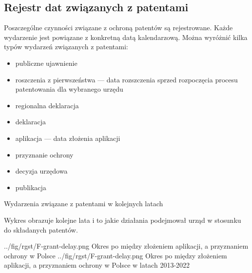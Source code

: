   \newpage\subsection
{Rejestr dat związanych z patentami}

Poszczególne czynności związane z ochroną patentów są rejestrowane.
Każde wydarzenie jest powiązane z konkretną datą kalendarzową.
Można wyróżnić kilka typów wydarzeń związanych z patentami:

  \begin{itemize}

\item
publiczne ujawnienie 


\item
roszczenia z pierwszeństwa  --- 
data rozszczenia sprzed rozpoczęcia procesu patentowania dla wybranego urzędu


\item
regionalna deklaracja 


\item
deklaracja 


\item
aplikacja  --- data złożenia aplikacji


\item
przyznanie ochrony 


\item
decyzja urzędowa


\item
publikacja
\end{itemize}



  \newpage
{}
{Wydarzenia związane z patentami w kolejnych latach}

Wykres obrazuje kolejne lata i to jakie
działania podejmował urząd w stosunku do składanych patentów.



  \newpage
\figsides
{../fig/rgst/F-grant-delay.png}
{Okres po między złożeniem aplikacji, a przyznaniem ochrony w Polsce}
{../fig/rgst/F-grant-delay.png}
{ Okres po między złożeniem aplikacji, a przyznaniem ochrony w Polsce 
  w latach 2013-2022 }










